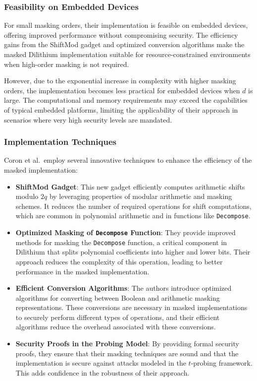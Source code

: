 \subsubsection{Feasibility on Embedded Devices}

For small masking orders, their implementation is feasible on embedded devices, offering improved performance without compromising security. The efficiency gains from the ShiftMod gadget and optimized conversion algorithms make the masked Dilithium implementation suitable for resource-constrained environments when high-order masking is not required.

However, due to the exponential increase in complexity with higher masking orders, the implementation becomes less practical for embedded devices when $d$ is large. The computational and memory requirements may exceed the capabilities of typical embedded platforms, limiting the applicability of their approach in scenarios where very high security levels are mandated.

\subsubsection{Implementation Techniques}

Coron et al.\ employ several innovative techniques to enhance the efficiency of the masked implementation:

\begin{itemize}
    \item \textbf{ShiftMod Gadget}: This new gadget efficiently computes arithmetic shifts modulo $2q$ by leveraging properties of modular arithmetic and masking schemes. It reduces the number of required operations for shift computations, which are common in polynomial arithmetic and in functions like \texttt{Decompose}.
    \item \textbf{Optimized Masking of \texttt{Decompose} Function}: They provide improved methods for masking the \texttt{Decompose} function, a critical component in Dilithium that splits polynomial coefficients into higher and lower bits. Their approach reduces the complexity of this operation, leading to better performance in the masked implementation.
    \item \textbf{Efficient Conversion Algorithms}: The authors introduce optimized algorithms for converting between Boolean and arithmetic masking representations. These conversions are necessary in masked implementations to securely perform different types of operations, and their efficient algorithms reduce the overhead associated with these conversions.
    \item \textbf{Security Proofs in the Probing Model}: By providing formal security proofs, they ensure that their masking techniques are sound and that the implementation is secure against attacks modeled in the $t$-probing framework. This adds confidence in the robustness of their approach.
\end{itemize}

